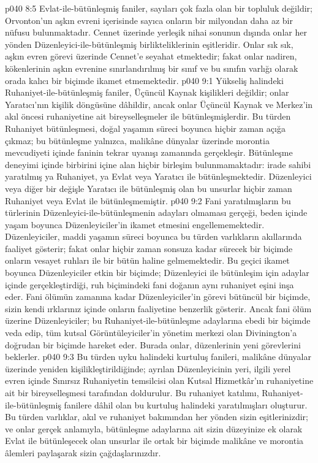 \vs p040 8:5 Evlat\hyp{}ile\hyp{}bütünleşmiş faniler, sayıları çok fazla olan bir topluluk değildir; Orvonton’un aşkın evreni içerisinde sayıca onların bir milyondan daha az bir nüfusu bulunmaktadır. Cennet üzerinde yerleşik nihai sonunun dışında onlar her yönden Düzenleyici\hyp{}ile\hyp{}bütünleşmiş birlikteliklerinin eşitleridir. Onlar sık sık, aşkın evren görevi üzerinde Cennet’e seyahat etmektedir; fakat onlar nadiren, kökenlerinin aşkın evrenine sınırlandırılmış bir sınıf ve bu sınıfın varlığı olarak orada kalıcı bir biçimde ikamet etmemektedir.
\vs p040 9:1 Yükseliş halindeki Ruhaniyet\hyp{}ile\hyp{}bütünleşmiş faniler, Üçüncül Kaynak kişilikleri değildir; onlar Yaratıcı’nın kişilik döngüsüne dâhildir, ancak onlar Üçüncül Kaynak ve Merkez’in akıl öncesi ruhaniyetine ait bireyselleşmeler ile bütünleşmişlerdir. Bu türden Ruhaniyet bütünleşmesi, doğal yaşamın süreci boyunca hiçbir zaman açığa çıkmaz; bu bütünleşme yalnızca, malikâne dünyalar üzerinde morontia mevcudiyeti içinde faninin tekrar uyanışı zamanında gerçekleşir. Bütünleşme deneyimi içinde birbirini içine alan hiçbir birleşim bulunmamaktadır: irade sahibi yaratılmış ya Ruhaniyet, ya Evlat veya Yaratıcı ile bütünleşmektedir. Düzenleyici veya diğer bir değişle Yaratıcı ile bütünleşmiş olan bu unsurlar hiçbir zaman Ruhaniyet veya Evlat ile bütünleşmemiştir.
\vs p040 9:2 Fani yaratılmışların bu türlerinin Düzenleyici\hyp{}ile\hyp{}bütünleşmenin adayları olmaması gerçeği, beden içinde yaşam boyunca Düzenleyiciler’in ikamet etmesini engellememektedir. Düzenleyiciler, maddi yaşamın süreci boyunca bu türden varlıkların akıllarında faaliyet gösterir; fakat onlar hiçbir zaman sonsuza kadar sürecek bir biçimde onların vesayet ruhları ile bir bütün haline gelmemektedir. Bu geçici ikamet boyunca Düzenleyiciler etkin bir biçimde; Düzenleyici ile bütünleşim için adaylar içinde gerçekleştirdiği, ruh biçimindeki fani doğanın aynı ruhaniyet eşini inşa eder. Fani ölümün zamanına kadar Düzenleyiciler’in görevi bütüncül bir biçimde, sizin kendi ırklarınız içinde onların faaliyetine benzerlik gösterir. Ancak fani ölüm üzerine Düzenleyiciler; bu Ruhaniyet\hyp{}ile\hyp{}bütünleşme adaylarına ebedi bir biçimde veda edip, tüm kutsal Görüntüleyiciler’in yönetim merkezi olan Divinington’a doğrudan bir biçimde hareket eder. Burada onlar, düzenlerinin yeni görevlerini beklerler.
\vs p040 9:3 Bu türden uyku halindeki kurtuluş fanileri, malikâne dünyalar üzerinde yeniden kişilikleştirildiğinde; ayrılan Düzenleyicinin yeri, ilgili yerel evren içinde Sınırsız Ruhaniyetin temsilcisi olan Kutsal Hizmetkâr’ın ruhaniyetine ait bir bireyselleşmesi tarafından doldurulur. Bu ruhaniyet katılımı, Ruhaniyet\hyp{}ile\hyp{}bütünleşmiş fanilere dâhil olan bu kurtuluş halindeki yaratılmışları oluşturur. Bu türden varlıklar, akıl ve ruhaniyet bakımından her yönden sizin eşitlerinizdir; ve onlar gerçek anlamıyla, bütünleşme adaylarına ait sizin düzeyinize ek olarak Evlat ile bütünleşecek olan unsurlar ile ortak bir biçimde malikâne ve morontia âlemleri paylaşarak sizin çağdaşlarınızdır.
